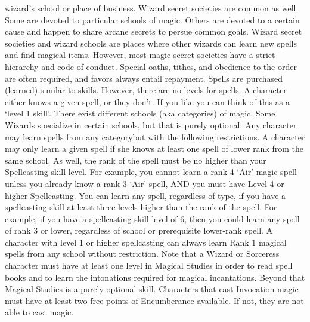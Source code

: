 \documentclass[twoside]{book}
\begin{document}
               wizard's school or place of business. Wizard secret
               societies are common as well. Some are devoted to
               particular schools of magic. Others are devoted to a
               certain cause and happen to share arcane secrets to persue
               common goals. Wizard secret societies and wizard schools
               are places where other wizards can learn new spells and
               find magical items. However, most magic secret societies
               have a strict hierarchy and code of conduct. Special
               oaths, tithes, and obedience to the order are often
               required, and favors always entail repayment.   Spells are purchased (learned) similar to skills.
               However, there are no levels for spells. A character
               either knows a given spell, or they don't. If you
               like you can think of this as a `level 1
               skill'.   There exist different schools (aka categories) of
               magic. Some Wizards specialize in certain schools, but
               that is purely optional. Any character may learn spells
               from any categorybut with the following
               restrictions. A character may only learn a given spell if
               she knows at least one spell of lower rank from the same
               school. As well, the rank of the spell must be no higher
               than your Spellcasting skill level. For example, you
               cannot learn a rank 4 `Air' magic spell unless
               you already know a rank 3 `Air' spell, AND you
               must have Level 4 or higher Spellcasting.   You can learn any spell, regardless of type, if you
               have a spellcasting skill at least three levels higher
               than the rank of the spell. For example, if you have a
               spellcasting skill level of 6, then you could learn any
               spell of rank 3 or lower, regardless of school or
               prerequisite lower-rank spell.   A character with level 1 or higher spellcasting can
               always learn Rank 1 magical spells from any school without
               restriction.   Note that a Wizard or Sorceress character must have
               at least one level in Magical Studies in order to read
               spell books and to learn the intonations required for
               magical incantations. Beyond that Magical Studies is a
               purely optional skill.   Characters that cast Invocation magic must have at
               least two free points of Encumberance available. If not,
               they are not able to cast magic. 
\end{document}
